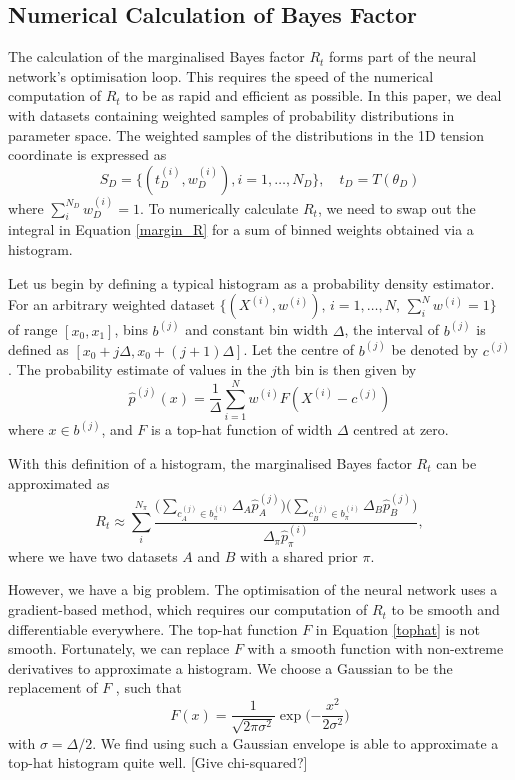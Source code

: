\documentclass[%
 reprint,
 amsmath,amssymb,
 aps,
]{revtex4-2}
\begin{document}
\subsection{Numerical Calculation of Bayes Factor}

The calculation of the marginalised Bayes factor $R_t$ forms part of the neural network's optimisation loop. This requires the speed of the numerical computation of $R_t$ to be as rapid and efficient as possible. In this paper, we deal with datasets containing weighted samples of probability distributions in parameter space. The weighted samples of the distributions in the 1D tension coordinate is expressed as
\begin{equation}
    S_D = \big\{(t_D^{(i)}, w_D^{(i)}), i = 1, \dots , N_D \big\}, \quad t_D = T(\theta_D)
\end{equation}
where $\sum_i^{N_D} w_D^{(i)} = 1$. To numerically calculate $R_t$, we need to swap out the integral in Equation \ref{margin_R} for a sum of binned weights obtained via a histogram. 

Let us begin by defining a typical histogram as a probability density estimator. For an arbitrary weighted dataset $\{(X^{(i)}, w^{(i)}), \, i = 1, \dots , N, \, \sum_i^N w^{(i)} = 1\}$ of range $[x_0, x_1]$, bins $b^{(j)}$ and constant bin width $\Delta$, the interval of $b^{(j)}$ is defined as $[x_0 + j\Delta, x_0 + (j+1)\Delta]$. Let the centre of $b^{(j)}$ be denoted by $c^{(j)}$. The probability estimate of values in the $j$th bin is then given by
\begin{equation} \label{tophat}
    \hat{p}^{(j)}(x) = \frac{1}{\Delta} \sum_{i=1}^{N} w^{(i)} F(X^{(i)} - c^{(j)})
\end{equation}
where $x \in b^{(j)}$, and  $F$ is a top-hat function of width $\Delta$ centred at zero.

With this definition of a histogram, the marginalised Bayes factor $R_t$ can be approximated as
\begin{equation}
    R_t \approx \sum_{i}^{N_\pi} \frac{\Big(\sum_{c_A^{(j)} \in b_\pi^{(i)}} \Delta_A \hat{p}_A^{(j)}\Big) \Big(\sum_{c_B^{(j)} \in b_\pi^{(i)}} \Delta_B \hat{p}_B^{(j)}\Big)}{\Delta_\pi \hat{p}_\pi^{(i)}},
\end{equation}
where we have two datasets $A$ and $B$ with a shared prior $\pi$.

However, we have a big problem. The optimisation of the neural network uses a gradient-based method, which requires our computation of $R_t$ to be smooth and differentiable everywhere. The top-hat function $F$ in Equation \ref{tophat} is not smooth. Fortunately, we can replace $F$ with a smooth function with non-extreme derivatives to approximate a histogram. We choose a Gaussian to be the replacement of $F$ \cite{Schutt2017}, such that
\begin{equation}
    F(x) = \frac{1}{\sqrt{2\pi \sigma^2}} \exp \bigg( {-\frac{x^2}{2 \sigma^2}} \bigg)
\end{equation}
with $\sigma = \Delta / 2$. We find using such a Gaussian envelope is able to approximate a top-hat histogram quite well. [Give chi-squared?]
\end{document}
